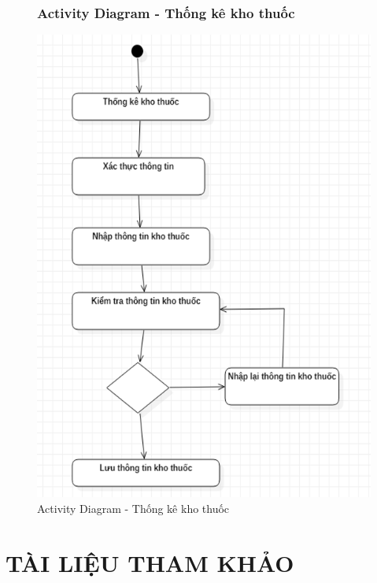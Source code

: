 \documentclass{report}
\begin{document}
\begin{center}
	\begin{figure}[!htp]
		\subsection{Activity Diagram - Thống kê kho thuốc}
		\begin{center}
			\includegraphics[scale=1]{Hinh/Activity diagram Thống kê kho thuốc.png}
		\end{center}
		\caption{Activity Diagram - Thống kê kho thuốc}
	\end{figure}
\end{center}

\chapter{TÀI LIỆU THAM KHẢO}
\fontsize{13}{15}\selectfont
\raggedright
\end{document}
